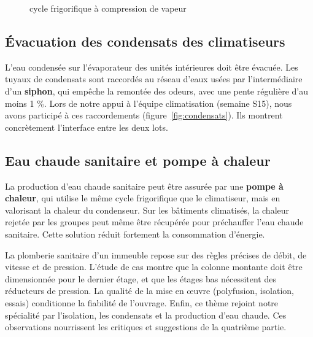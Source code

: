 \begin{figure}[H]\centering

\caption{cycle frigorifique à compression de vapeur}\label{fig:cycle}
\end{figure}

\subsection{Évacuation des condensats des climatiseurs}
L'eau condensée sur l'évaporateur des unités intérieures doit être évacuée. Les tuyaux de
condensats sont raccordés au réseau d'eaux usées par l'intermédiaire d'un \textbf{siphon},
qui empêche la remontée des odeurs, avec une pente régulière d'au moins 1 \%. Lors de notre
appui à l'équipe climatisation (semaine S15), nous avons participé à ces raccordements
(figure~\ref{fig:condensats}). Ils montrent concrètement l'interface entre les deux lots.


\subsection{Eau chaude sanitaire et pompe à chaleur}
La production d'eau chaude sanitaire peut être assurée par une \textbf{pompe à chaleur}, qui
utilise le même cycle frigorifique que le climatiseur, mais en valorisant la chaleur du
condenseur. Sur les bâtiments climatisés, la chaleur rejetée par les groupes peut même être
récupérée pour préchauffer l'eau chaude sanitaire. Cette solution réduit fortement la
consommation d'énergie.

\conclusionPartielle
La plomberie sanitaire d'un immeuble repose sur des règles précises de débit, de vitesse et de
pression. L'étude de cas montre que la colonne montante doit être dimensionnée pour le dernier
étage, et que les étages bas nécessitent des réducteurs de pression. La qualité de la mise en
œuvre (polyfusion, isolation, essais) conditionne la fiabilité de l'ouvrage. Enfin, ce thème
rejoint notre spécialité par l'isolation, les condensats et la production d'eau chaude. Ces
observations nourrissent les critiques et suggestions de la quatrième partie.
